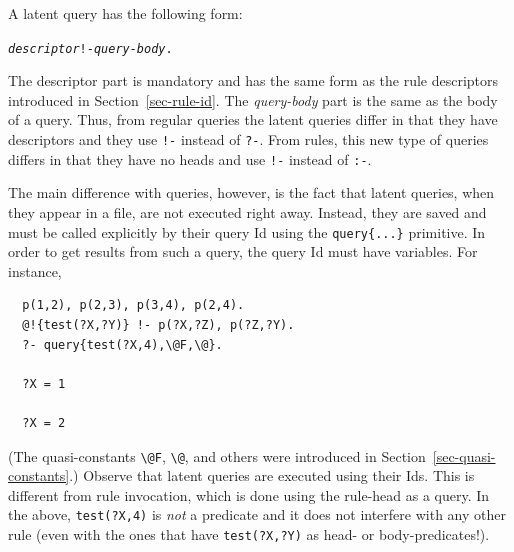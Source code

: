 \documentclass[11pt]{article}
\newcommand{\bs}{\textbackslash}
\begin{document}
A latent query has the following form:
\begin{alltt}
   \textnormal{\em descriptor}  !- \textnormal{\emph{query-body}}.
\end{alltt}
The descriptor part is mandatory and has the same form as the rule descriptors
introduced in Section~\ref{sec-rule-id}.
The \emph{query-body} part is the same as the body of a query. Thus, from
regular queries the latent queries differ in that they have descriptors and
they use \texttt{!-} instead of \texttt{?-}. From rules, this new type of
queries differs in that they have no heads and use \texttt{!-} instead of
\texttt{:-}.

The main difference with queries, however, is the fact that latent queries,
when they appear in a file,
are not executed right away. Instead, they are saved and must be called
explicitly by their query Id using the \texttt{query\{...\}} primitive. In
order to get results from such a query,
the query Id must have variables. For instance,
\begin{verbatim}
  p(1,2), p(2,3), p(3,4), p(2,4).
  @!{test(?X,?Y)} !- p(?X,?Z), p(?Z,?Y).
  ?- query{test(?X,4),\@F,\@}.

  ?X = 1

  ?X = 2
\end{verbatim}
(The quasi-constants \texttt{\bs{}@F}, \texttt{\bs{}@}, and others
were introduced in Section~\ref{sec-quasi-constants}.)
Observe that latent queries are executed using their Ids. This is different
from rule invocation, which is done using the rule-head as a query. In the
above, \texttt{test(?X,4)} is \emph{not} a predicate and it does not
interfere with any other rule (even with the ones that have \texttt{test(?X,?Y)}
as head- or body-predicates!).
\end{document}
